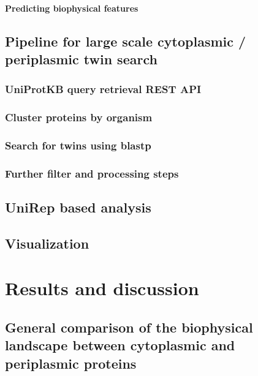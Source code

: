 \documentclass[a4paper]{article}
\begin{document}
		\paragraph{Predicting biophysical features}
			
	\subsection{Pipeline for large scale cytoplasmic / periplasmic twin search}
		
		\subsubsection{UniProtKB query retrieval REST API}
			
		\subsubsection{Cluster proteins by organism}
			
		\subsubsection{Search for twins using blastp}
			
		\subsubsection{Further filter and processing steps}
			
	\subsection{UniRep based analysis}
		
	\subsection{Visualization}
		
\newpage

\section{Results and discussion}
	\subsection{General comparison of the biophysical landscape between cytoplasmic and periplasmic proteins}
		
\end{document}
